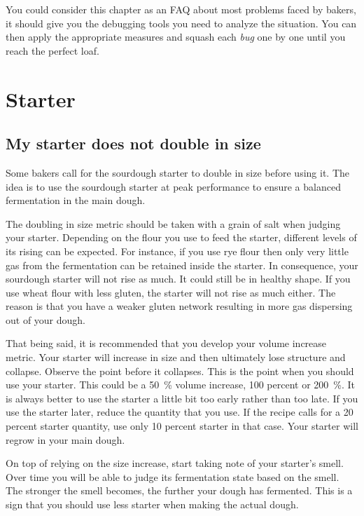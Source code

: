 \begin{quoting}
You could consider this chapter as an FAQ about most problems faced by
bakers, it should give you the debugging tools you need to analyze the
situation.  You can then apply the appropriate measures and squash each
\emph{bug} one by one until you reach the perfect loaf.
\end{quoting}

\section{Starter}
\subsection{My starter does not double in size}

Some bakers call for the sourdough starter to
double in size before using it.
The idea is to use the sourdough starter at
peak performance to ensure a
balanced fermentation in the main dough.

The doubling in size metric should be
taken with a grain of salt when judging
your starter. Depending on the flour
you use to feed the starter, different levels
of its rising can be expected.
For instance, if you use rye flour then only
very little gas from the
fermentation can be retained inside the
starter. In consequence, your
sourdough starter will not rise as much. It
could still be in healthy shape. If you use wheat flour with less gluten,
the starter will not rise as
much either. The reason is that you have a weaker
gluten network resulting in
more gas dispersing out of your dough.

That being said, it is recommended that you develop
your volume increase
metric. Your starter will increase in size and then
ultimately lose structure
and collapse. Observe the point before it collapses.
This is the point when
you should use your starter. This could be a
 \qty{50}{\percent} volume increase, 100
percent or \qty{200}{\percent}. It is always better to use
the starter a little bit
too early rather than too late. If you use the
starter later, reduce the
quantity that you use. If the recipe calls for a 20
percent starter quantity,
use only 10
percent starter in that case. Your starter will
regrow in your main dough.

On top of relying on the size increase, start
taking note of your starter's
smell. Over time you will be able to judge its
fermentation state based on the
smell. The stronger the smell becomes, the further
your dough has fermented.
This is a sign that you should use less starter
when making the actual dough.

